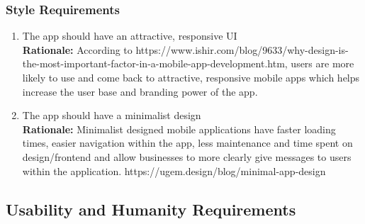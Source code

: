 \documentclass[]{article}
\begin{document}
\subsubsection{Style Requirements}
\label{ssub:style_requirements}
\begin{enumerate}[{LF-S}1. ]
	\item The app should have an attractive, responsive UI \\
	{\bf Rationale:} According to https://www.ishir.com/blog/9633/why-design-is-the-most-important-factor-in-a-mobile-app-development.htm, users are more likely to use and come back to attractive, responsive mobile apps which helps increase the user base and branding power of the app. 
	\item The app should have a minimalist design \\
	{\bf Rationale:} Minimalist designed mobile applications have faster loading times, easier navigation within the app, less maintenance and time spent on design/frontend and allow businesses to more clearly give messages to users within the application. https://ugem.design/blog/minimal-app-design
\end{enumerate}


\subsection{Usability and Humanity Requirements}
\label{sub:usability_and_humanity_requirements}
\end{document}
